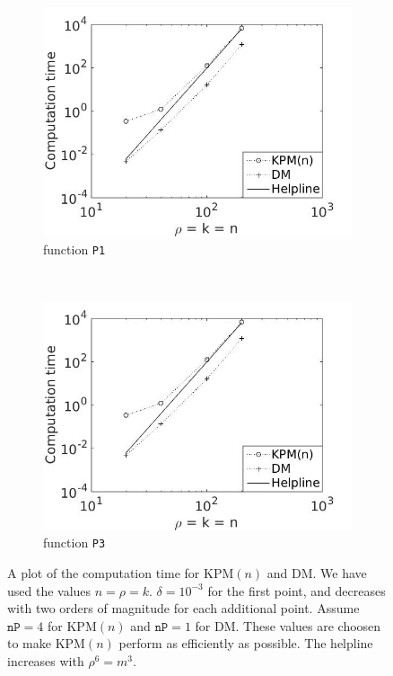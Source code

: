 \begin{figure}[H]
        \centering
        \begin{subfigure}[b]{0.45\textwidth}
                \includegraphics[width=\textwidth]{fig/comp2}
                \caption{function \texttt{P1}}
                \label{fig:c1comp1m}
        \end{subfigure}%
        ~
        \begin{subfigure}[b]{0.45\textwidth}
                \includegraphics[width=\textwidth]{fig/comp2}
                \caption{function \texttt{P3}}
                \label{fig:c2comp2m}
        \end{subfigure}
        \caption{A plot of the computation time for KPM$(n)$ and DM. We have used the values $n = \rho = k$. $\delta = 10^{-3}$ for the first point, and decreases with two orders of magnitude for each additional point. Assume $\texttt{nP} = 4$ for KPM$(n)$ and $\texttt{nP} = 1$ for DM. These values are choosen to make KPM$(n)$ perform as efficiently as possible. The helpline increases with $\rho^6 = m^3$.}\label{fig:comp}
\end{figure}
